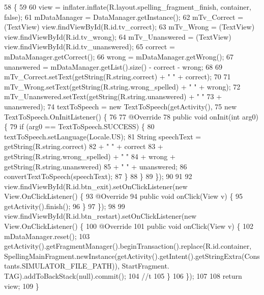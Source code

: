 \begin{DoxyCode}
58                                                                                                       \{
59 
60         view = inflater.inflate(R.layout.spelling\_fragment\_finish, container, \textcolor{keyword}{false});
61         mDataManager = DataManager.getInstance();
62         mTv\_Correct = (TextView) view.findViewById(R.id.tv\_correct);
63         mTv\_Wrong = (TextView) view.findViewById(R.id.tv\_wrong);
64         mTv\_Unanswered = (TextView) view.findViewById(R.id.tv\_unanswered);
65         correct = mDataManager.getCorrect();
66         wrong = mDataManager.getWrong();
67         unanswered = mDataManager.getList().size() - correct - wrong;
68 
69         mTv\_Correct.setText(getString(R.string.correct) + \textcolor{stringliteral}{" "} + correct);
70 
71         mTv\_Wrong.setText(getString(R.string.wrong\_spelled) + \textcolor{stringliteral}{" "} + wrong);
72         mTv\_Unanswered.setText(getString(R.string.unanswered) + \textcolor{stringliteral}{" "}
73                 + unanswered);
74         textToSpeech = \textcolor{keyword}{new} TextToSpeech(getActivity(),
75                 \textcolor{keyword}{new} TextToSpeech.OnInitListener() \{
76 
77                     @Override
78                     \textcolor{keyword}{public} \textcolor{keywordtype}{void} onInit(\textcolor{keywordtype}{int} arg0) \{
79                         \textcolor{keywordflow}{if} (arg0 == TextToSpeech.SUCCESS) \{
80                             textToSpeech.setLanguage(Locale.US);
81                             String speechText = getString(R.string.correct)
82                                     + \textcolor{stringliteral}{" "} + correct
83                                     + getString(R.string.wrong\_spelled) + \textcolor{stringliteral}{" "}
84                                     + wrong + getString(R.string.unanswered)
85                                     + \textcolor{stringliteral}{" "} + unanswered;
86                             convertTextToSpeech(speechText);
87                         \}
88                     \}
89                 \});
90 
91 
92         view.findViewById(R.id.btn\_exit).setOnClickListener(\textcolor{keyword}{new} View.OnClickListener() \{
93             @Override
94             \textcolor{keyword}{public} \textcolor{keywordtype}{void} onClick(View v) \{
95                 getActivity().finish();
96             \}
97         \});
98 
99         view.findViewById(R.id.btn\_restart).setOnClickListener(\textcolor{keyword}{new} View.OnClickListener() \{
100             @Override
101             \textcolor{keyword}{public} \textcolor{keywordtype}{void} onClick(View v) \{
102                 mDataManager.reset();
103                 getActivity().getFragmentManager().beginTransaction().replace(R.id.container, 
      SpellingMainFragment.newInstance(getActivity().getIntent().getStringExtra(Constants.SIMULATOR\_FILE\_PATH)), StartFragment.
      TAG).addToBackStack(null).commit();
104 \textcolor{comment}{//t}
105             \}
106         \});
107 
108         \textcolor{keywordflow}{return} view;
109     \}
\end{DoxyCode}

